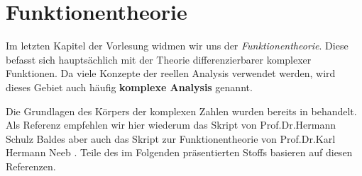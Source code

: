 \chapter{Funktionentheorie}
\label{\detokenize{complexanalysis/complexanalysis:funktionentheorie}}\label{\detokenize{complexanalysis/complexanalysis::doc}}
\par
Im letzten Kapitel der Vorlesung widmen wir uns der \emph{Funktionentheorie}.
Diese befasst sich hauptsächlich mit der Theorie differenzierbarer komplexer Funktionen.
Da viele Konzepte der reellen Analysis verwendet werden, wird dieses Gebiet auch häufig \textbf{komplexe Analysis} genannt.

\par
Die Grundlagen des Körpers der komplexen Zahlen wurden bereits in \cite{Ten21} behandelt. Als Referenz empfehlen wir hier wiederum das Skript von Prof.Dr.Hermann Schulz Baldes \cite{SB18} aber auch das Skript zur Funktionentheorie von Prof.Dr.Karl Hermann Neeb \cite{Nee17}. Teile des im Folgenden präsentierten Stoffs basieren auf diesen Referenzen.



